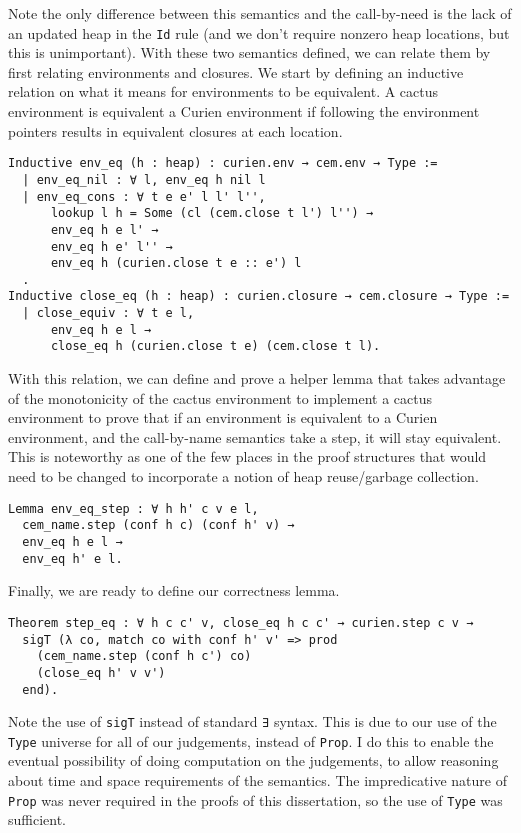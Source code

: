 Note the only difference between this semantics and the call-by-need is the lack
of an updated heap in the \texttt{Id} rule (and we don't require nonzero heap
locations, but this is unimportant). With these two semantics defined, we can
relate them by first relating environments and closures. We start by defining an
inductive relation on what it means for environments to be equivalent.
A cactus environment is equivalent a Curien environment if following the
environment pointers results in equivalent closures at each location. 

\begin{verbatim}
Inductive env_eq (h : heap) : curien.env → cem.env → Type := 
  | env_eq_nil : ∀ l, env_eq h nil l
  | env_eq_cons : ∀ t e e' l l' l'',
      lookup l h = Some (cl (cem.close t l') l'') →
      env_eq h e l' →
      env_eq h e' l'' →
      env_eq h (curien.close t e :: e') l
  .
Inductive close_eq (h : heap) : curien.closure → cem.closure → Type := 
  | close_equiv : ∀ t e l, 
      env_eq h e l → 
      close_eq h (curien.close t e) (cem.close t l).
\end{verbatim}

With this relation, we can define and prove a helper lemma that takes advantage
of the monotonicity of the cactus environment to implement a cactus environment
to prove that if an environment is equivalent to a Curien environment, and the
call-by-name \ce semantics take a step, it will stay equivalent. This is
noteworthy as one of the few places in the proof structures that would need to
be changed to incorporate a notion of heap reuse/garbage collection.

\begin{verbatim}
Lemma env_eq_step : ∀ h h' c v e l, 
  cem_name.step (conf h c) (conf h' v) →
  env_eq h e l → 
  env_eq h' e l.
\end{verbatim}

Finally, we are ready to define our correctness lemma.

\begin{verbatim}
Theorem step_eq : ∀ h c c' v, close_eq h c c' → curien.step c v →
  sigT (λ co, match co with conf h' v' => prod 
    (cem_name.step (conf h c') co)
    (close_eq h' v v') 
  end). 
\end{verbatim}

Note the use of \texttt{sigT} instead of standard \texttt{∃} syntax. This is due
to our use of the \texttt{Type} universe for all of our judgements, instead of
\texttt{Prop}. I do this to enable the eventual possibility of doing
computation on the judgements, to allow reasoning about time and space
requirements of the semantics. The impredicative nature of \texttt{Prop} was
never required in the proofs of this dissertation, so the use of \texttt{Type}
was sufficient. 

